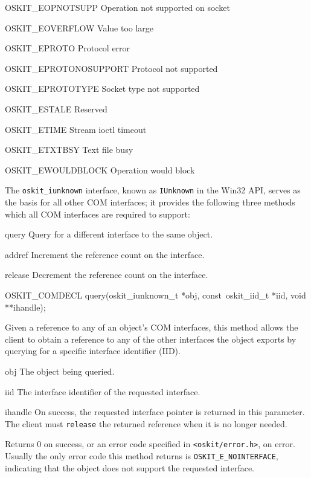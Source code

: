 \begin{apidesc}
\begin{icsymlist}
	\item[OSKIT_EOPNOTSUPP]		Operation not supported on socket
	\item[OSKIT_EOVERFLOW]		Value too large
	\item[OSKIT_EPROTO]		Protocol error
	\item[OSKIT_EPROTONOSUPPORT]	Protocol not supported
	\item[OSKIT_EPROTOTYPE]		Socket type not supported
	\item[OSKIT_ESTALE]		Reserved
	\item[OSKIT_ETIME]		Stream ioctl timeout
	\item[OSKIT_ETXTBSY]		Text file busy
	\item[OSKIT_EWOULDBLOCK]		Operation would block
	\end{icsymlist}
\end{apidesc}


The \texttt{oskit_iunknown} interface,
known as \texttt{IUnknown} in the Win32 API,
serves as the basis for all other COM interfaces;
it provides the following three methods
which all COM interfaces are required to support:
\begin{csymlist}
\item[query]
	Query for a different interface to the same object.
\item[addref]
	Increment the reference count on the interface.
\item[release]
	Decrement the reference count on the interface.
\end{csymlist}

\begin{apisyn}

	\funcproto OSKIT_COMDECL
	query(oskit_iunknown_t *obj, const~oskit_iid_t *iid,
		\outparam void **ihandle);
\end{apisyn}
\begin{apidesc}
	Given a reference to any of an object's COM interfaces,
	this method allows the client to obtain a reference
	to any of the other interfaces the object exports
	by querying for a specific interface identifier (IID).
\end{apidesc}
\begin{apiparm}
	\item[obj]
		The object being queried.
	\item[iid]
		The interface identifier of the requested interface.
	\item[ihandle]
		On success,
		the requested interface pointer is returned in this parameter.
		The client must \texttt{release} the returned reference
		when it is no longer needed.
\end{apiparm}
\begin{apiret}
	Returns 0 on success, or an error code specified in
	{\tt <oskit/error.h>}, on error.
	Usually the only error code this method returns
	is \texttt{OSKIT_E_NOINTERFACE},
	indicating that the object does not support the requested interface.
\end{apiret}

